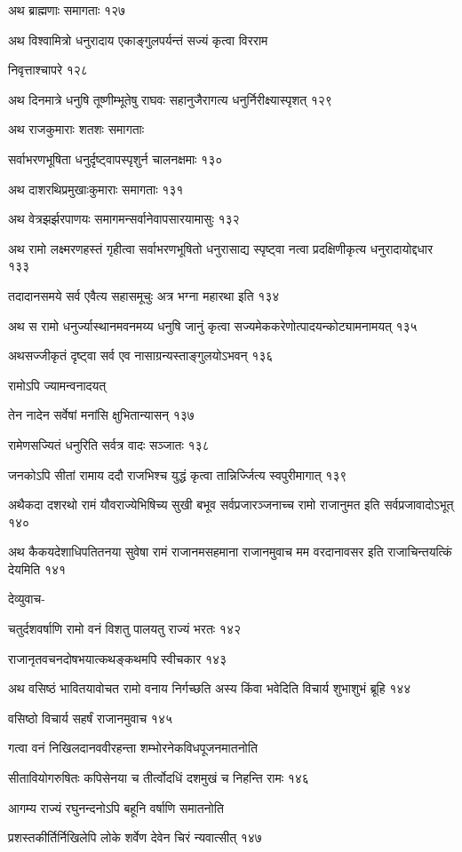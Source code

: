 अथ ब्राह्मणाः समागताः १२७

अथ विश्वामित्रो धनुरादाय एकाङ्गुलपर्यन्तं सज्यं कृत्वा विरराम

निवृत्ताश्चापरे १२८

अथ दिनमात्रे धनुषि तूष्णीम्भूतेषु राघवः सहानुजैरागत्य धनुर्निरीक्ष्यास्पृशत् १२९

अथ राजकुमाराः शतशः समागताः

सर्वाभरणभूषिता धनुर्दृष्ट्वापस्पृशुर्न चालनक्षमाः १३०

अथ दाशरथिप्रमुखाःकुमाराः समागताः १३१

अथ वेत्रझर्झरपाणयः समागमन्सर्वानेवापसारयामासुः १३२

अथ रामो लक्ष्मरणहस्तं गृहीत्वा सर्वाभरणभूषितो धनुरासाद्य स्पृष्ट्वा नत्वा प्रदक्षिणीकृत्य
धनुरादायोद्दधार १३३

तदादानसमये सर्व एवैत्य सहासमूचुः अत्र भग्ना महारथा इति १३४

अथ स रामो धनुर्ज्यास्थानमवनमय्य धनुषि जानुं कृत्वा सज्यमेककरेणोत्पादयन्कोट्यामनामयत् १३५

अथसज्जीकृतं दृष्ट्वा सर्व एव नासाग्रन्यस्ताङ्गुलयोऽभवन् १३६

रामोऽपि ज्यामन्वनादयत्

तेन नादेन सर्वेषां मनांसि क्षुभितान्यासन् १३७

रामेणसज्यितं धनुरिति सर्वत्र वादः सञ्जातः १३८

जनकोऽपि सीतां रामाय ददौ राजभिश्च युद्धं कृत्वा तान्निर्ज्जित्य स्वपुरीमागात् १३९

अथैकदा दशरथो रामं यौवराज्येभिषिच्य सुखी बभूव सर्वप्रजारञ्जनाच्च रामो राजानुमत इति
सर्वप्रजावादोऽभूत् १४०

अथ कैकयदेशाधिपतितनया सुवेषा रामं राजानमसहमाना राजानमुवाच मम वरदानावसर इति
राजाचिन्तयत्किं देयमिति १४१

देव्युवाच-

चतुर्दशवर्षाणि रामो वनं विशतु पालयतु राज्यं भरतः १४२

राजानृतवचनदोषभयात्कथङ्कथमपि स्वीचकार १४३

अथ वसिष्ठं भावितयावोचत रामो वनाय निर्गच्छति अस्य किंवा भवेदिति विचार्य शुभाशुभं
ब्रूहि १४४

वसिष्ठो विचार्य सहर्षं राजानमुवाच १४५

गत्वा वनं निखिलदानववीरहन्ता शम्भोरनेकविधपूजनमातनोति

सीतावियोगरुषितः कपिसेनया च तीर्त्वोदधिं दशमुखं च निहन्ति रामः १४६

आगम्य राज्यं रघुनन्दनोऽपि बहूनि वर्षाणि समातनोति

प्रशस्तकीर्तिर्निखिलेपि लोके शर्वेण देवेन चिरं न्यवात्सीत् १४७


